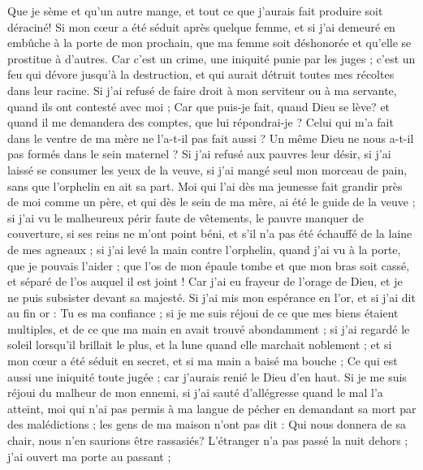\begin{multicols}{2}
Que je sème et qu'un autre mange, et tout ce que j'aurais fait produire soit déraciné!
Si mon cœur a été séduit après quelque femme, et si j'ai demeuré en embûche à la porte de mon prochain,
que ma femme soit déshonorée et qu'elle se prostitue à d'autres.
Car c'est un crime, une iniquité punie par les juges ;
c'est un feu qui dévore jusqu'à la destruction, et qui aurait détruit toutes mes récoltes dans leur racine.
Si j'ai refusé de faire droit à mon serviteur ou à ma servante, quand ils ont contesté avec moi ;
Car que puis-je fait, quand Dieu se lève? et quand il me demandera des comptes, que lui répondrai-je ?
Celui qui m'a fait dans le ventre de ma mère ne l'a-t-il pas fait aussi ? Un même Dieu ne nous a-t-il pas formés dans le sein maternel ?
Si j'ai refusé aux pauvres leur désir, si j'ai laissé se consumer les yeux de la veuve,
si j'ai mangé seul mon morceau de pain, sans que l'orphelin en ait sa part.
Moi qui l'ai dès ma jeunesse fait grandir près de moi comme un père, et qui dès le sein de ma mère, ai été le guide de la veuve ;
si j'ai vu le malheureux périr faute de vêtements, le pauvre manquer de couverture,
si ses reins ne m'ont point béni, et s'il n'a pas été échauffé de la laine de mes agneaux ;
si j'ai levé la main contre l'orphelin, quand j'ai vu à la porte, que je pouvais l'aider ;
que l'os de mon épaule tombe et que mon bras soit cassé, et séparé de l'os auquel il est joint !
Car j'ai eu frayeur de l'orage de Dieu, et je ne puis subsister devant sa majesté. 
Si j'ai mis mon espérance en l'or, et si j'ai dit au fin or : Tu es ma confiance ;
si je me suis réjoui de ce que mes biens étaient multiples, et de ce que ma main en avait trouvé abondamment ;
si j'ai regardé le soleil lorsqu'il brillait le plus, et la lune quand elle marchait noblement ;
et si mon cœur a été séduit en secret, et si ma main a baisé ma bouche ; 
Ce qui est aussi une iniquité toute jugée ; car j'aurais renié le Dieu d'en haut.
Si je me suis réjoui du malheur de mon ennemi, si j'ai sauté d'allégresse quand le mal l'a atteint,
moi qui n'ai pas permis à ma langue de pécher en demandant sa mort par des malédictions ;
les gens de ma maison n'ont pas dit : Qui nous donnera de sa chair, nous n'en saurions être rassasiés?
L'étranger n'a pas passé la nuit dehors ; j'ai ouvert ma porte au passant ;

\end{multicols}
